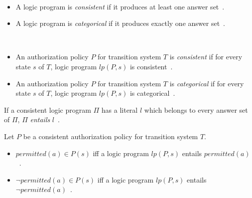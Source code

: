 \begin{definition}
    \label{def:lp_consistent}
    \label{def:lp_categorical}
    ~

    \begin{itemize}
        \item A logic program is \textit{consistent} if it produces at least one answer set~\citep{gelfond_authorization_2008}.
        \item A logic program is \textit{categorical} if it produces exactly one answer set~\citep{gelfond_authorization_2008}.
    \end{itemize}
\end{definition}

\begin{definition}
    \label{def:authorization_consistent}
    \label{def:authorization_categorical}
    ~

    \begin{itemize}
        \item An authorization policy $P$ for transition system $T$ is \textit{consistent} if for every state $s$ of $T$, logic program $lp(P, s)$ is consistent~\citep{gelfond_authorization_2008}.
        \item An authorization policy $P$ for transition system $T$ is \textit{categorical} if for every state $s$ of $T$, logic program $lp(P, s)$ is categorical~\citep{gelfond_authorization_2008}.
    \end{itemize}
\end{definition}

\begin{definition}
    \label{def:entails}
    If a consistent logic program $\Pi$ has a literal $l$ which belongs to every answer set of $\Pi$, $\Pi$ \textit{entails} $l$~\citep{gelfond_authorization_2008}.
\end{definition}

\begin{definition}
    Let $P$ be a consistent authorization policy for transition system $T$.

    \begin{itemize}
        \item $permitted(a) \in P(s)$ iff a logic program $lp(P, s)$ entails $permitted(a)$~\citep{gelfond_authorization_2008}.
        \item $\neg permitted(a) \in P(s)$ iff a logic program $lp(P, s)$ entails $\neg permitted(a)$~\citep{gelfond_authorization_2008}.
    \end{itemize}
\end{definition}

